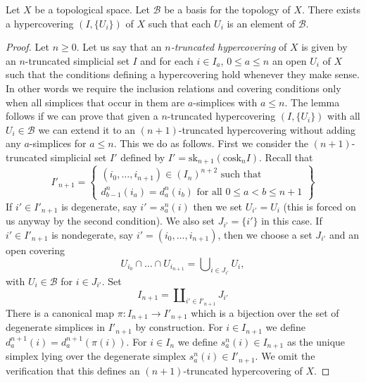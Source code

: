 \begin{lemma}
\label{lemma-basis-hypercovering}
Let $X$ be a topological space.
Let $\mathcal{B}$ be a basis for the topology of $X$.
There exists a hypercovering $(I, \{U_i\})$ of $X$
such that each $U_i$ is an element of $\mathcal{B}$.
\end{lemma}

\begin{proof}
Let $n \geq 0$.
Let us say that an {\it $n$-truncated hypercovering} of $X$ is
given by an $n$-truncated simplicial set $I$ and for each
$i \in I_a$, $0 \leq a \leq n$ an open $U_i$ of $X$ such that
the conditions defining a hypercovering hold whenever they make sense.
In other words we require the inclusion relations and covering
conditions only when all simplices that occur in them
are $a$-simplices with $a \leq n$. The lemma follows if we can prove
that given a $n$-truncated hypercovering $(I, \{U_i\})$ with
all $U_i \in \mathcal{B}$ we can extend it to an $(n + 1)$-truncated
hypercovering without adding any $a$-simplices for $a \leq n$.
This we do as follows. First we consider the $(n + 1)$-truncated
simplicial set $I'$ defined by
$I' = \text{sk}_{n + 1}(\text{cosk}_n I)$.
Recall that
$$
I'_{n + 1} =
\left\{
\begin{matrix}
(i_0, \ldots, i_{n + 1}) \in (I_n)^{n + 2} \text{ such that}\\
d^n_{b - 1}(i_a) = d^n_a(i_b) \text{ for all }0\leq a < b\leq n + 1
\end{matrix}
\right\}
$$
If $i' \in I'_{n + 1}$ is degenerate, say $i' = s^n_a(i)$ then we set
$U_{i'} = U_i$ (this is forced on us anyway by the second condition).
We also set $J_{i'} = \{i'\}$ in this case.
If $i' \in I'_{n + 1}$ is nondegerate, say
$i' = (i_0, \ldots, i_{n + 1})$, then we choose a set
$J_{i'}$ and an open covering
\begin{equation}
\label{equation-choose-covering}
U_{i_0} \cap \ldots \cap U_{i_{n + 1}} =
\bigcup\nolimits_{i \in J_{i'}} U_i,
\end{equation}
with $U_i \in \mathcal{B}$ for $i \in J_{i'}$.
Set
$$
I_{n + 1} = \coprod\nolimits_{i' \in I'_{n + 1}} J_{i'}
$$
There is a canonical map $\pi : I_{n + 1} \to I'_{n + 1}$ which is
a bijection over the set of degenerate simplices in $I'_{n + 1}$ by
construction.
For $i \in I_{n + 1}$ we define $d^{n + 1}_a(i) = d^{n + 1}_a(\pi(i))$.
For $i \in I_n$ we define $s^n_a(i) \in I_{n + 1}$ as the unique
simplex lying over the degenerate simplex $s^n_a(i) \in I'_{n + 1}$.
We omit the verification that this defines an $(n + 1)$-truncated
hypercovering of $X$.
\end{proof}

